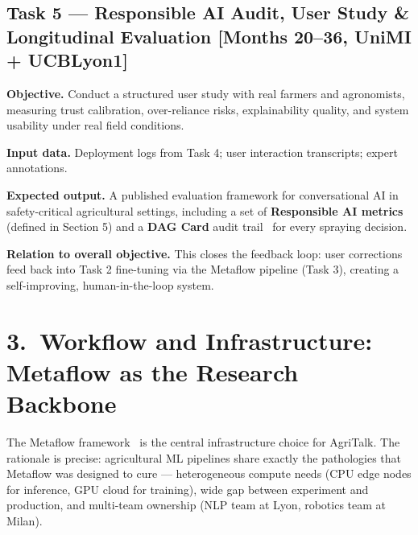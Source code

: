 \documentclass[11pt,a4paper]{article}
\begin{document}
\subsection{Task 5 — Responsible AI Audit, User Study \& Longitudinal Evaluation
  \textnormal{[Months 20--36, UniMI + UCBLyon1]}}

\textbf{Objective.}
Conduct a structured user study with real farmers and agronomists, measuring trust calibration,
over-reliance risks, explainability quality, and system usability under real field conditions.

\textbf{Input data.}
Deployment logs from Task 4; user interaction transcripts; expert annotations.

\textbf{Expected output.}
A published evaluation framework for conversational AI in safety-critical agricultural settings,
including a set of \textbf{Responsible AI metrics} (defined in Section 5) and a
\textbf{DAG Card} audit trail~\cite{tagliabue_dag_card_2021} for every spraying decision.

\textbf{Relation to overall objective.}
This closes the feedback loop: user corrections feed back into Task 2 fine-tuning
via the Metaflow pipeline (Task 3), creating a self-improving, human-in-the-loop system.

\section{3.\ Workflow and Infrastructure: Metaflow as the Research Backbone}

The Metaflow framework~\cite{tagliabue_metaflow_2023,tuulos_2022} is the central
infrastructure choice for AgriTalk. The rationale is precise: agricultural ML pipelines share exactly
the pathologies that Metaflow was designed to cure — heterogeneous compute needs (CPU edge
nodes for inference, GPU cloud for training), wide gap between experiment and production,
and multi-team ownership (NLP team at Lyon, robotics team at Milan).
\end{document}
